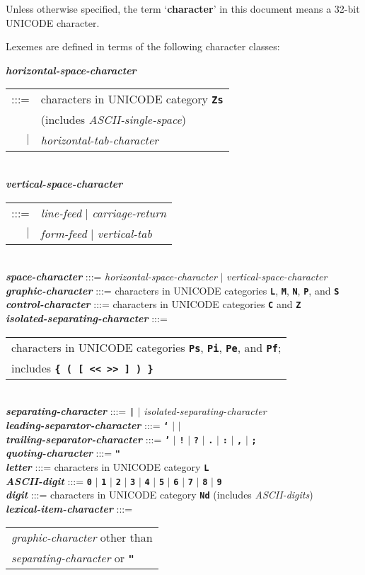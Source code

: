 \documentclass[12pt]{article}
\newcommand{\TT}[1]{{\tt \bfseries #1}}
\newcommand{\key}[1]{{\rm \bfseries #1}}
\newcommand{\emkey}[1]{{\em \bfseries #1}}
\newenvironment{indpar}[1][0.3in]%
	{\begin{list}{}%
		     {\setlength{\itemsep}{0in}%
		      \setlength{\topsep}{0in}%
		      \setlength{\parsep}{1ex}%
		      \setlength{\labelwidth}{#1}%
		      \setlength{\leftmargin}{#1}%
		      \addtolength{\leftmargin}{\labelsep}}%
	 \item}%
	{\end{list}}
\begin{document}
Unless otherwise specified, the term `\key{character}' in this
document means a 32-bit UNICODE character.

Lexemes are defined in terms of
the following character classes:

\begin{indpar}
\emkey{horizontal-space-character}
    \begin{tabular}[t]{rl}
    :::= & characters in UNICODE category \TT{Zs} \\
         & (includes {\em ASCII-single-space}) \\
    $|$  & {\em horizontal-tab-character}
    \end{tabular}
\\
\emkey{vertical-space-character}
    \begin{tabular}[t]{rl}
    :::= & {\em line-feed} $|$ {\em carriage-return} \\
    $|$ & {\em form-feed} $|$ {\em vertical-tab}
    \end{tabular}
\\
\emkey{space-character} :::= {\em horizontal-space-character}
                        $|$ {\em vertical-space-character}
\\[1ex]
\emkey{graphic-character} :::= characters in UNICODE categories
                              \TT{L}, \TT{M}, \TT{N}, \TT{P}, and \TT{S}
\\
\emkey{control-character} :::=
	characters in UNICODE categories \TT{C} and \TT{Z}
\\[1ex]
\emkey{isolated-separating-character} :::= \\
\hspace*{0.5in}
    \begin{tabular}[t]{l}
    characters in UNICODE categories \TT{Ps}, \TT{Pi}, \TT{Pe},
    and \TT{Pf}; \\
    includes \TT{\{ ( [ << >> ] ) \}}
    \end{tabular}
\\
\emkey{separating-character} :::= \TT{|} $|$ {\em isolated-separating-character}
\\[1ex]
\emkey{leading-separator-character} :::=
	\TT{`} $|$ \TT{\textexclamdown} $|$ \TT{\textquestiondown}
\\
\emkey{trailing-separator-character} :::=
	\TT{'} $|$ \TT{!} $|$ \TT{?} $|$ \TT{.} $|$ \TT{:}
	       $|$ \TT{,} $|$ \TT{;}
\\[1ex]
\emkey{quoting-character} :::= \TT{"}
\\[1ex]
\emkey{letter} :::=
    characters in UNICODE category \TT{L}
\\
\emkey{ASCII-digit} :::= \TT{0} $|$ \TT{1} $|$ \TT{2} $|$ \TT{3} $|$ \TT{4}
                     $|$ \TT{5} $|$ \TT{6} $|$ \TT{7} $|$ \TT{8} $|$ \TT{9}
\\
\emkey{digit} :::=
    characters in UNICODE category \TT{Nd}
    (includes {\em ASCII-digits})
\\
\emkey{lexical-item-character} :::=
	\begin{tabular}[t]{l}
        {\em graphic-character} other than \\
	{\em separating-character} or \TT{"}
	\end{tabular}
\end{indpar}
\end{document}
